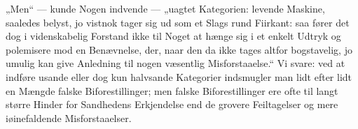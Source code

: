 \documentclass[12pt,a4paper]{book}
\begin{document}
„Men“ --- kunde Nogen indvende --- „uagtet Kategorien: levende Maskine,
saaledes belyst, jo vistnok tager sig ud som et Slags rund Fiirkant: saa
fører det dog i videnskabelig Forstand ikke til Noget at hænge sig i et
enkelt Udtryk og polemisere mod en Benævnelse, der, naar den da ikke
tages altfor bogstavelig, jo umulig kan give Anledning til nogen
væsentlig Misforstaaelse.“ Vi svare: ved at indføre usande eller dog kun
halvsande Kategorier indsmugler man lidt efter lidt en Mængde falske
Biforestillinger; men falske Biforestillinger ere ofte til langt større
Hinder for Sandhedens Erkjendelse end de grovere Feiltagelser og mere
iøinefaldende Misforstaaelser.

%

\setcounter{footnote}{0}
\end{document}
